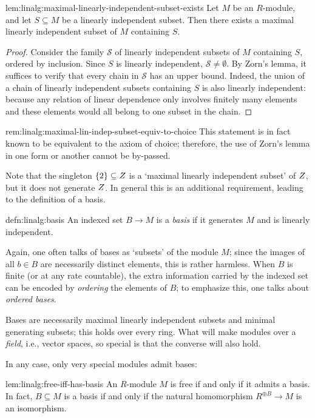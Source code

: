\begin{lem}{}{lem:linalg:maximal-linearly-independent-subset-exists}
  Let $M$ be an $R$-module, and let $S \subseteq M$ be a linearly
  independent subset. Then there exists a maximal linearly independent
  subset of $M$ containing $S$.
\end{lem}
\begin{proof}
  Consider the family $\mathscr{S}$ of linearly independent subsets of
  $M$ containing $S$, ordered by inclusion. Since $S$ is linearly
  independent, $\mathscr{S} \neq \emptyset$. By Zorn's lemma, it
  suffices to verify that every chain in $\mathscr{S}$ has an upper
  bound. Indeed, the union of a chain of linearly independent subsets
  containing $S$ is also linearly independent: because any relation of
  linear dependence only involves finitely many elements and these
  elements would all belong to one subset in the chain.
\end{proof}
\begin{rem}{}{rem:linalg:maximal-lin-indep-subset-equiv-to-choice}
  This statement is in fact known to be equivalent to the axiom of
  choice; therefore, the use of Zorn's lemma in one form or another
  cannot be by-passed.
\end{rem}

Note that the singleton $\{2\} \subseteq Z$ is a `maximal linearly
independent subset' of $Z$, but it does not generate $Z$. In general
this is an additional requirement, leading to the definition of a
basis.

\begin{defn}{}{defn:linalg:basis}
  An indexed set $B \to M$ is a \emph{basis} if it generates $M$ and
  is linearly independent.
\end{defn}
Again, one often talks of bases as `subsets' of the module $M$; since
the images of all $b \in B$ are necessarily distinct elements, this is
rather harmless. When $B$ is finite (or at any rate countable), the
extra information carried by the indexed set can be encoded by
\emph{ordering} the elements of $B$; to emphasize this, one talks
about \emph{ordered bases}.

Bases are necessarily maximal linearly independent subsets and minimal
generating subsets; this holds over every ring. What will make modules
over a \emph{field}, i.e., vector spaces, so special is that the
converse will also hold.

In any case, only very special modules admit bases:
\begin{lem}{}{lem:linalg:free-iff-has-basis}
  An $R$-module $M$ is free if and only if it admits a basis. In fact,
  $B \subseteq M$ is a basis if and only if the natural homomorphism
  $R^{\oplus B} \to M$ is an isomorphism.
\end{lem}

